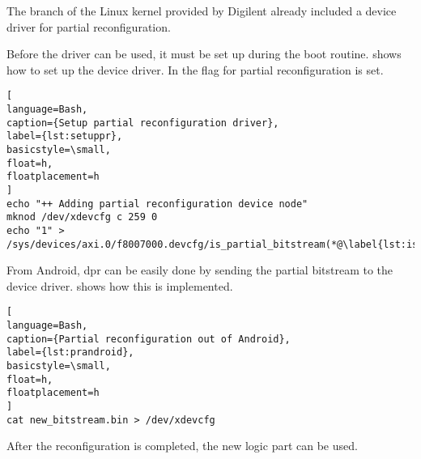 The branch of the Linux kernel provided by Digilent \cite{DigilentLinux} already included a device driver for partial reconfiguration.

Before the driver can be used, it must be set up during the boot routine.  shows how to set up the device driver. In  the flag for partial reconfiguration is set.

\begin{lstlisting}[
language=Bash,
caption={Setup partial reconfiguration driver},
label={lst:setuppr},
basicstyle=\small,
float=h,
floatplacement=h
]
echo "++ Adding partial reconfiguration device node"
mknod /dev/xdevcfg c 259 0
echo "1" > /sys/devices/axi.0/f8007000.devcfg/is_partial_bitstream(*@\label{lst:ispart}@*)
\end{lstlisting}

From Android, \gls{dpr} can be easily done by sending the partial bitstream to the device driver.  shows how this is implemented.

\begin{lstlisting}[
language=Bash,
caption={Partial reconfiguration out of Android},
label={lst:prandroid},
basicstyle=\small,
float=h,
floatplacement=h
]
cat new_bitstream.bin > /dev/xdevcfg
\end{lstlisting}

After the reconfiguration is completed, the new logic part can be used.
